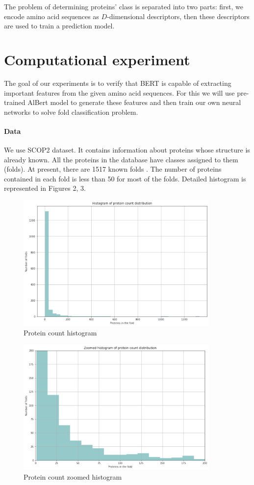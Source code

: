 \documentclass[12pt, twoside]{article}
\begin{document}
The problem of determining proteins' class is separated into two parts: first, we encode amino acid sequences as $D$-dimensional descriptors, then these descriptors are used to train a prediction model.  


\section{Computational experiment}

The goal of our experiments is to verify that BERT is capable of extracting important features from the given amino acid sequences. For this we will use pre-trained AlBert\cite{ProtBert} model to generate these features and then train our own neural networks to solve fold classification problem. 

\paragraph{Data}
\noindent
We use SCOP2 \cite{SCOP2FST, SCOP2SND} dataset. It contains information about proteins whose structure is already known. All the proteins in the database have classes assigned to them (folds).  At present, there are 1517 known folds \cite{SCOP2SND}. The number of proteins contained in each fold is less than 50 for most of the folds. Detailed histogram is represented in Figures 2, 3. 

\begin{figure}[htp]
    \centering
    \includegraphics[width=10cm]{figures/figure2.pdf}
    \caption{Protein count histogram}
\end{figure}

\begin{figure}[htp]
    \centering
    \includegraphics[width=10cm]{figures/figure3.pdf}
    \caption{Protein count zoomed histogram}
\end{figure}
\end{document}
